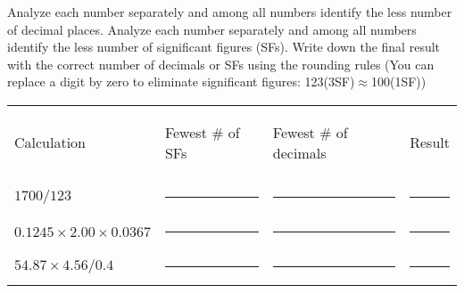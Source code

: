 \documentclass[main.tex]{subfiles}
\begin{document}
\begin{steps}
    \newstep[] Analyze each number separately and among all numbers identify the less number of decimal places.
    \newstep[] Analyze each number separately and among all numbers identify the less number of significant figures (SFs). 
    \newstep[]Write down the final result with the correct number of decimals or SFs using the rounding rules (You can replace a digit by zero to eliminate significant figures: 123(3SF)$\approx$100(1SF))
\end{steps}

\begin{center} \begin{tabular}{ p{5cm} p{3cm} p{3cm}p{3cm}   }
   \begin{bf}Calculation\end{bf} & \begin{bf}Fewest \# of SFs\end{bf} &\begin{bf}Fewest \# of decimals\end{bf} &\begin{bf}Result\end{bf} \\[0.1cm]     
   $1700/123$ 				&\rule{3cm}{0.4pt}&\rule{3cm}{0.4pt}&\rule{3cm}{0.4pt}  \\[0.2cm]      
    $0.1245\times 2.00\times 0.0367 $  				&\rule{3cm}{0.4pt}&\rule{3cm}{0.4pt}&\rule{3cm}{0.4pt}  \\[0.2cm]      
   $54.87\times 4.56/ 0.4$  				&\rule{3cm}{0.4pt}&\rule{3cm}{0.4pt}&\rule{3cm}{0.4pt}  \\[0.2cm]      
 \end{tabular}\end{center}
\end{document}
